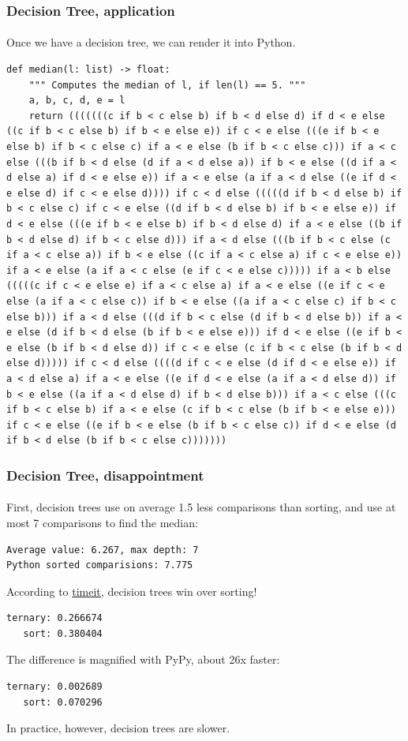 \documentclass{beamer}                             %
\begin{document}
\begin{frame}[fragile]
\frametitle{Decision Tree, application}
\framesubtitle{}
Once we have a decision tree, we can render it into Python.
\begin{verbatim}
def median(l: list) -> float:
    """ Computes the median of l, if len(l) == 5. """
    a, b, c, d, e = l
    return (((((((c if b < c else b) if b < d else d) if d < e else ((c if b < c else b) if b < e else e)) if c < e else (((e if b < e else b) if b < c else c) if a < e else (b if b < c else c))) if a < c else (((b if b < d else (d if a < d else a)) if b < e else ((d if a < d else a) if d < e else e)) if a < e else (a if a < d else ((e if d < e else d) if c < e else d)))) if c < d else (((((d if b < d else b) if b < c else c) if c < e else ((d if b < d else b) if b < e else e)) if d < e else (((e if b < e else b) if b < d else d) if a < e else ((b if b < d else d) if b < c else d))) if a < d else (((b if b < c else (c if a < c else a)) if b < e else ((c if a < c else a) if c < e else e)) if a < e else (a if a < c else (e if c < e else c))))) if a < b else (((((c if c < e else e) if a < c else a) if a < e else ((e if c < e else (a if a < c else c)) if b < e else ((a if a < c else c) if b < c else b))) if a < d else (((d if b < c else (d if b < d else b)) if a < e else (d if b < d else (b if b < e else e))) if d < e else ((e if b < e else (b if b < d else d)) if c < e else (c if b < c else (b if b < d else d))))) if c < d else ((((d if c < e else (d if d < e else e)) if a < d else a) if a < e else ((e if d < e else (a if a < d else d)) if b < e else ((a if a < d else d) if b < d else b))) if a < c else (((c if b < c else b) if a < e else (c if b < c else (b if b < e else e))) if c < e else ((e if b < e else (b if b < c else c)) if d < e else (d if b < d else (b if b < c else c)))))))
\end{verbatim}
\end{frame}

\begin{frame}[fragile]
\frametitle{Decision Tree, disappointment}
\framesubtitle{}
First, decision trees use on average 1.5 less comparisons than sorting,
and use at most 7 comparisons to find the median:
\begin{verbatim}
Average value: 6.267, max depth: 7
Python sorted comparisions: 7.775
\end{verbatim}
According to \href{https://docs.python.org/3/library/timeit.html}{timeit},
decision trees win over sorting!
\begin{verbatim}
ternary: 0.266674
   sort: 0.380404
\end{verbatim}
The difference is magnified with PyPy, about 26x faster:
\begin{verbatim}
ternary: 0.002689
   sort: 0.070296
\end{verbatim}
In practice, however, decision trees are slower.
\end{frame}
\end{document}
